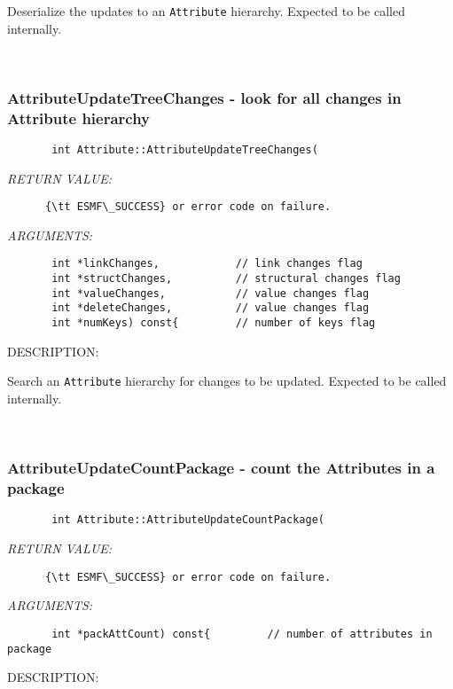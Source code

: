      Deserialize the updates to an {\tt Attribute} hierarchy.  
      Expected to be called internally.
   
 
\mbox{}\hrulefill\
 
\subsubsection [AttributeUpdateTreeChanges] {AttributeUpdateTreeChanges - look for all changes in Attribute hierarchy}


  
\begin{verbatim}       int Attribute::AttributeUpdateTreeChanges(\end{verbatim}{\em RETURN VALUE:}
\begin{verbatim}      {\tt ESMF\_SUCCESS} or error code on failure.\end{verbatim}{\em ARGUMENTS:}
\begin{verbatim}       int *linkChanges,            // link changes flag
       int *structChanges,          // structural changes flag
       int *valueChanges,           // value changes flag
       int *deleteChanges,          // value changes flag
       int *numKeys) const{         // number of keys flag\end{verbatim}
{\sf DESCRIPTION:\\ }


      Search an {\tt Attribute} hierarchy for changes to be updated.  
      Expected to be called internally.
   
 
\mbox{}\hrulefill\
 
\subsubsection [AttributeUpdateCountPackage] {AttributeUpdateCountPackage - count the Attributes in a package}


  
\begin{verbatim}       int Attribute::AttributeUpdateCountPackage(\end{verbatim}{\em RETURN VALUE:}
\begin{verbatim}      {\tt ESMF\_SUCCESS} or error code on failure.\end{verbatim}{\em ARGUMENTS:}
\begin{verbatim}       int *packAttCount) const{         // number of attributes in package\end{verbatim}
{\sf DESCRIPTION:\\ }


